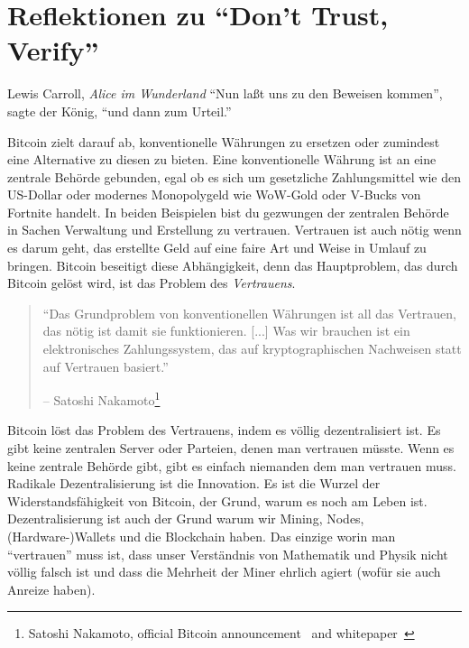 \chapter{Reflektionen zu \enquote{Don't Trust, Verify}}
\label{les:16}

\begin{chapquote}{Lewis Carroll, \textit{Alice im Wunderland}}
\enquote{Nun laßt uns zu den Beweisen kommen}, sagte der König, \enquote{und dann zum Urteil.}
\end{chapquote}

Bitcoin zielt darauf ab, konventionelle Währungen zu ersetzen oder zumindest eine
Alternative zu diesen zu bieten. Eine konventionelle Währung ist an eine
zentrale Behörde gebunden, egal ob es sich um gesetzliche Zahlungsmittel wie den
US-Dollar oder modernes Monopolygeld wie WoW-Gold oder V-Bucks von Fortnite
handelt. In beiden Beispielen bist du gezwungen der zentralen Behörde in Sachen
Verwaltung und Erstellung zu vertrauen. Vertrauen ist auch nötig wenn es darum
geht, das erstellte Geld auf eine faire Art und Weise in Umlauf zu bringen.
Bitcoin beseitigt diese Abhängigkeit, denn das Hauptproblem, das durch Bitcoin
gelöst wird, ist das Problem des \textit{Vertrauens}.

\begin{quotation}\begin{samepage}
\enquote{Das Grundproblem von konventionellen Währungen ist all das Vertrauen,
das nötig ist damit sie funktionieren. [...] Was wir brauchen ist ein
elektronisches Zahlungssystem, das auf kryptographischen Nachweisen statt auf
Vertrauen basiert.}
\begin{flushright} -- Satoshi Nakamoto\footnote{Satoshi Nakamoto, official Bitcoin announcement~\cite{bitcoin-announcement} and whitepaper~\cite{whitepaper}}
\end{flushright}\end{samepage}\end{quotation}

Bitcoin löst das Problem des Vertrauens, indem es völlig dezentralisiert ist. Es
gibt keine zentralen Server oder Parteien, denen man vertrauen müsste. Wenn es
keine zentrale Behörde gibt, gibt es einfach niemanden dem man vertrauen muss.
Radikale Dezentralisierung ist die Innovation. Es ist die Wurzel der
Widerstandsfähigkeit von Bitcoin, der Grund, warum es noch am Leben ist.
Dezentralisierung ist auch der Grund warum wir Mining, Nodes, (Hardware-)Wallets
und die Blockchain haben. Das einzige worin man \enquote{vertrauen} muss ist,
dass unser Verständnis von Mathematik und Physik nicht völlig falsch ist
und dass die Mehrheit der Miner ehrlich agiert (wofür sie auch Anreize haben).

